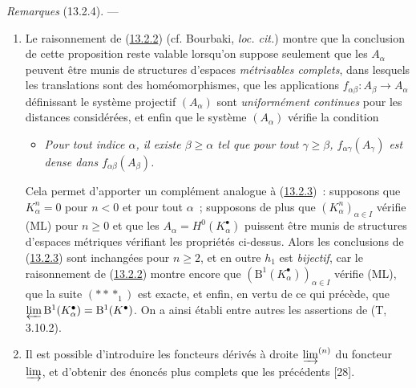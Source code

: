 \begin{env}[13.2.4]
\label{0.13.2.4-fr}
\emph{Remarques} (13.2.4). ---
\begin{enumerate}
\item[(i)]
Le raisonnement de (\hyperref[0.13.2.2-fr]{13.2.2}) (cf. Bourbaki,
\emph{loc. cit.}) montre que la conclusion de cette proposition reste
valable lorsqu'on suppose seulement que les $A_\alpha$ peuvent être munis
de structures d'espaces \emph{métrisables complets}, dans lesquels les
translations sont des homéomorphismes, que les applications
$f_{\alpha\beta}:A_\beta\to A_\alpha$ définissant le système projectif
$(A_\alpha)$ sont \emph{uniformément continues} pour les distances
considérées, et enfin que le système $(A_\alpha)$ vérifie la condition
\begin{itemize}
\item[(ML$'$)]
\emph{Pour tout indice $\alpha$, il existe $\beta\geq\alpha$ tel que pour
tout $\gamma\geq\beta$, $f_{\alpha\gamma}(A_\gamma)$ est dense dans
$f_{\alpha\beta}(A_\beta)$.}
\end{itemize}

Cela permet d'apporter un complément analogue à
(\hyperref[0.13.2.3-fr]{13.2.3})~: supposons que
$K_\alpha^n=0$ pour $n<0$ et pour tout $\alpha$~; supposons de plus que
$(K_\alpha^n)_{\alpha\in I}$ vérifie (ML) pour $n\geq0$ et que les
$A_\alpha=H^0(K_\alpha^\bullet)$ puissent être munis de structures
d'espaces métriques vérifiant les propriétés ci-dessus. Alors les
conclusions de (\hyperref[0.13.2.3-fr]{13.2.3}) sont inchangées pour
$n\geq2$, et en outre $h_1$ est \emph{bijectif}, car le raisonnement de
(\hyperref[0.13.2.2-fr]{13.2.2}) montre encore que
$(\mathrm B^1(K_\alpha^\bullet))_{\alpha\in I}$ vérifie (ML), que la suite
$(***_1)$ est exacte, et enfin, en vertu de ce qui précède, que
$\varprojlim\mathrm B^1(K_\alpha^\bullet)=\mathrm B^1(K^\bullet)$. On a
ainsi établi entre autres les assertions de (T, 3.10.2).

\item[(ii)]
Il est possible d'introduire les foncteurs dérivés à droite
$\varinjlim^{(n)}$ du foncteur $\varinjlim$, et d'obtenir des énoncés
plus complets que les précédents [28].
\end{enumerate}
\end{env}

